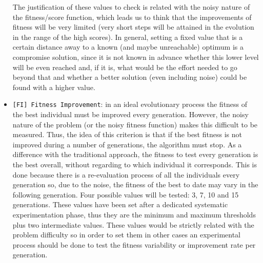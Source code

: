 \documentclass[runningheads,a4paper]{llncs}
\begin{document}
\begin{itemize}
The justification of these values to check is related with the noisy nature of the fitness/score function, which leads us to think that the improvements of fitness will be very limited (very short steps will be attained in the evolution in the range of the high scores).
In general, setting a fixed value that is a certain distance away to a known (and maybe unreachable) optimum is a compromise solution, since it is not known in advance whether this lower level will be even reached and, if it is, what would be the effort needed to go beyond that and whether a better solution (even including noise) could be found with a higher value. 

    \item \texttt{[FI] Fitness Improvement}: in an ideal evolutionary process the fitness of the best individual must be improved every generation. However, the noisy nature of the problem (or the noisy fitness function) makes this difficult to be measured. Thus, the idea of this criterion is that if the best fitness is not improved during a number of generations, the algorithm must stop. As a difference with the traditional approach, the fitness to test every generation is the best overall, without regarding to which individual it corresponds. This is done because there is a re-evaluation process of all the individuals every generation so, due to the noise, the fitness of the best to date may vary in the following generation.
Four possible values will be tested: 3, 7, 10 and 15 generations. %
These values have been set after a dedicated systematic experimentation phase, thus they are the minimum and maximum thresholds plus two intermediate values. These values would be strictly related with the problem difficulty so in order to set them in other cases an experimental process should be done to test the fitness variability or improvement rate per generation.
\end{itemize}
\end{document}

